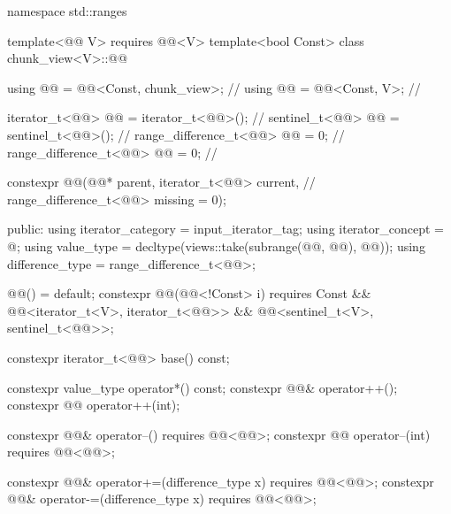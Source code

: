 %
\begin{codeblock}
namespace std::ranges {
  template<@@ V>
    requires @@<V>
  template<bool Const>
  class chunk_view<V>::@@ {
    using @@ = @@<Const, chunk_view>;                      // \expos
    using @@ = @@<Const, V>;                                 // \expos

    iterator_t<@@> @@ = iterator_t<@@>();                     // \expos
    sentinel_t<@@> @@ = sentinel_t<@@>();                         // \expos
    range_difference_t<@@> @@ = 0;                                    // \expos
    range_difference_t<@@> @@ = 0;                              // \expos

    constexpr @@(@@* parent, iterator_t<@@> current,       // \expos
                       range_difference_t<@@> missing = 0);

  public:
    using iterator_category = input_iterator_tag;
    using iterator_concept = @\seebelow@;
    using value_type = decltype(views::take(subrange(@@, @@), @@));
    using difference_type = range_difference_t<@@>;

    @@() = default;
    constexpr @@(@@<!Const> i)
      requires Const && @@<iterator_t<V>, iterator_t<@@>>
                     && @@<sentinel_t<V>, sentinel_t<@@>>;

    constexpr iterator_t<@@> base() const;

    constexpr value_type operator*() const;
    constexpr @@& operator++();
    constexpr @@ operator++(int);

    constexpr @@& operator--() requires @@<@@>;
    constexpr @@ operator--(int) requires @@<@@>;

    constexpr @@& operator+=(difference_type x)
      requires @@<@@>;
    constexpr @@& operator-=(difference_type x)
      requires @@<@@>;

}}
\end{codeblock}
